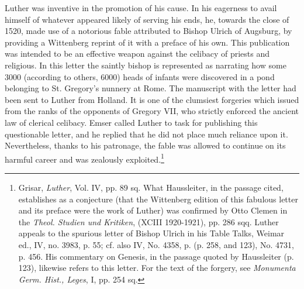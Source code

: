 Luther was inventive in the promotion of his cause. In his eagerness
to avail himself of whatever appeared likely of serving his ends,
he, towards the close of 1520, made use of a notorious fable attributed
to Bishop Ulrich of Augsburg, by providing a Wittenberg reprint
of it with a preface of his own. This publication was intended
to be an effective weapon against the celibacy of priests and religious.
In this letter the saintly bishop is represented as narrating how some
3000 (according to others, 6000) heads of infants were discovered in
a pond belonging to St. Gregory’s nunnery at Rome. The manuscript with
the letter had been sent to Luther from Holland. It is
one of the clumsiest forgeries which issued from the ranks of the opponents
of Gregory VII, who strictly enforced the ancient law of
clerical celibacy. Emser called Luther to task for publishing this questionable
letter, and he replied that he did not place much reliance
upon it. Nevertheless, thanks to his patronage, the fable was allowed
to continue on its harmful career and was zealously exploited.\footnote
{Grisar, \textit{Luther}, Vol. IV, pp. 89 sq. What Haussleiter, in the passage cited, establishes
as a conjecture (that the Wittenberg edition of this fabulous letter and its preface were
the work of Luther) was confirmed by Otto Clemen in the \textit{Theol. Studien und Kritiken},
(XCIII 1920-1921), pp. 286 sqq. Luther appeals to the spurious letter of Bishop Ulrich
in his Table Talks, Weimar ed., IV, no. 3983, p. 55; cf. also IV, No. 4358, p. (p. 258, and 123),
No. 4731, p. 456. His commentary on Genesis, in the passage quoted by Haussleiter (p. 123),
likewise refers to this letter. For the text of the forgery, see \textit{Monumenta Germ. Hist.,
Leges}, I, pp. 254 sq.}

